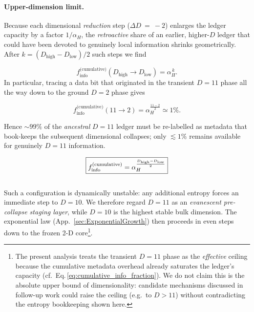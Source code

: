 \documentclass[a4paper, 12pt, oneside]{book}
\numberwithin{equation}{chapter}
\begin{document}
\paragraph{Upper-dimension limit.}

Because each dimensional \emph{reduction} step (\(\Delta D~=~-2\))
enlarges the ledger capacity by a factor \(1/\alpha_H\),
the \emph{retroactive} share of an earlier, higher-\(D\) ledger that could
have been devoted to genuinely local information shrinks geometrically.
After \(k = (D_{\text{high}} - D_{\text{low}})/2\) such steps we find

\[
  f_{\text{info}}^{\text{(cumulative)}}(D_{\text{high}}\!\to\!D_{\text{low}})
    = \alpha_H^{\,k}.
\]
In particular, tracing a data bit that originated in the transient
\(D=11\) phase all the way down to the ground \(D=2\) phase gives

\[
  f_{\text{info}}^{\text{(cumulative)}}(11\!\to\!2)
    = \alpha_H^{\frac{11-2}{2}}
    \simeq 1\%.
\]

Hence \(\sim 99\%\) of the \emph{ancestral} \(D=11\) ledger must be
re-labelled as metadata that book-keeps the subsequent dimensional
collapses; only \(\lesssim 1\%\) remains available for genuinely
\(D=11\) information.

\medskip
\begin{equation}
  \boxed{%
    f_{\text{info}}^{\text{(cumulative)}} =
      \alpha_H^{\frac{D_{\text{high}}-D_{\text{low}}}{2}} }
  \label{eq:cumulative_info_fraction}
\end{equation}
\\
Such a configuration is dynamically unstable: any additional entropy forces an immediate step to $D=10$. We therefore regard $D=11$ as an \emph{evanescent pre-collapse staging layer}, while $D=10$ is the highest stable bulk dimension. The exponential law (App.~\ref{sec:ExponentialGrowth}) then proceeds in even steps down to the frozen 2-D core\footnote{The present analysis treats the transient \(D=11\) phase
as the \emph{effective} ceiling because the cumulative metadata overhead
already saturates the ledger’s capacity (cf.\ Eq.\,\eqref{eq:cumulative_info_fraction}).
We do not claim this is the absolute upper bound of dimensionality:
candidate mechanisms discussed in follow-up work could raise the ceiling
(e.g.\ to \(D>11\)) without contradicting the entropy bookkeeping shown
here.}.
\end{document}
